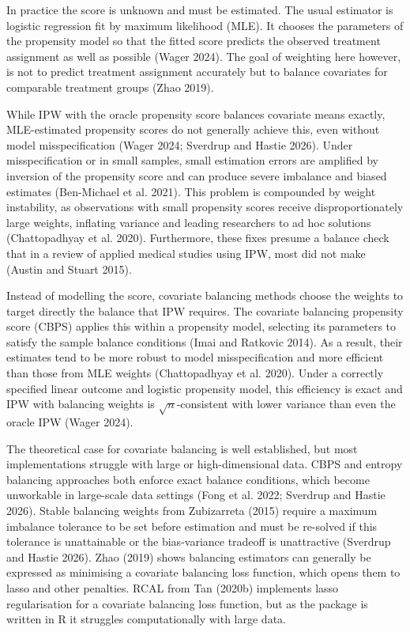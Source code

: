 \documentclass[
  12pt,
  a4paper,
]{article}
\begin{document}
In practice the score is unknown and must be estimated. The usual
estimator is logistic regression fit by maximum likelihood (MLE). It
chooses the parameters of the propensity model so that the fitted score
predicts the observed treatment assignment as well as possible (Wager
2024). The goal of weighting here however, is not to predict treatment
assignment accurately but to balance covariates for comparable treatment
groups (Zhao 2019).

While IPW with the oracle propensity score balances covariate means
exactly, MLE-estimated propensity scores do not generally achieve this,
even without model misspecification (Wager 2024; Sverdrup and Hastie
2026). Under misspecification or in small samples, small estimation
errors are amplified by inversion of the propensity score and can
produce severe imbalance and biased estimates (Ben-Michael et al. 2021).
This problem is compounded by weight instability, as observations with
small propensity scores receive disproportionately large weights,
inflating variance and leading researchers to ad hoc solutions
(Chattopadhyay et al. 2020). Furthermore, these fixes presume a balance
check that in a review of applied medical studies using IPW, most did
not make (Austin and Stuart 2015).

Instead of modelling the score, covariate balancing methods choose the
weights to target directly the balance that IPW requires. The covariate
balancing propensity score (CBPS) applies this within a propensity
model, selecting its parameters to satisfy the sample balance conditions
(Imai and Ratkovic 2014). As a result, their estimates tend to be more
robust to model misspecification and more efficient than those from MLE
weights (Chattopadhyay et al. 2020). Under a correctly specified linear
outcome and logistic propensity model, this efficiency is exact and IPW
with balancing weights is \(\sqrt{n}\)-consistent with lower variance
than even the oracle IPW (Wager 2024).

The theoretical case for covariate balancing is well established, but
most implementations struggle with large or high-dimensional data. CBPS
and entropy balancing approaches both enforce exact balance conditions,
which become unworkable in large-scale data settings (Fong et al. 2022;
Sverdrup and Hastie 2026). Stable balancing weights from Zubizarreta
(2015) require a maximum imbalance tolerance to be set before estimation
and must be re-solved if this tolerance is unattainable or the
bias-variance tradeoff is unattractive (Sverdrup and Hastie 2026). Zhao
(2019) shows balancing estimators can generally be expressed as
minimising a covariate balancing loss function, which opens them to
lasso and other penalties. RCAL from Tan (2020b) implements lasso
regularisation for a covariate balancing loss function, but as the
package is written in R it struggles computationally with large data.
\end{document}
